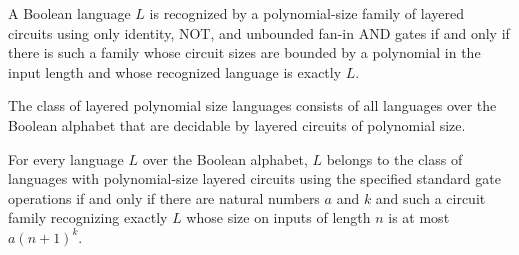 \begin{theorem}
\label{Language.inLayeredPPoly_iff}
\leanok
{}
A Boolean language $L$ is recognized by a polynomial-size family of layered circuits
using only identity, NOT, and unbounded fan-in AND gates if and only if there is such a
family whose circuit sizes are bounded by a polynomial in the input length and whose
recognized language is exactly $L$.
\end{theorem}

\begin{definition}
\label{BoolCircuit.LayeredPPoly}
\leanok
{}
The class of layered polynomial size languages consists of all languages over the
Boolean alphabet that are decidable by layered circuits of polynomial size.
\end{definition}

\begin{theorem}
\label{BoolCircuit.mem_LayeredPPoly_iff}
\leanok
{}
For every language $L$ over the Boolean alphabet, $L$ belongs to the class of languages
with polynomial-size layered circuits using the specified standard gate operations if
and only if there are natural numbers $a$ and $k$ and such a circuit family recognizing
exactly $L$ whose size on inputs of length $n$ is at most $a(n+1)^k$.
\end{theorem}
